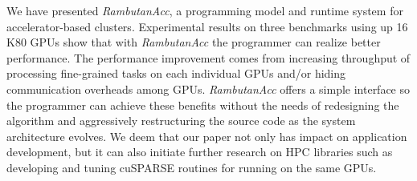 We have presented {\em RambutanAcc}, a programming model and runtime system for accelerator-based clusters.
Experimental results on three benchmarks using up 16 K80 GPUs show that with {\em RambutanAcc} the programmer can realize better performance.
The performance improvement comes from increasing throughput of processing fine-grained tasks on each individual GPUs and/or hiding communication overheads among GPUs.
{\em RambutanAcc} offers a simple interface so the programmer can achieve these benefits without the needs of redesigning the algorithm and aggressively restructuring the source code as the system architecture evolves.
We deem that our paper not only has impact on application development, but it can also initiate further research on HPC libraries such as developing and tuning cuSPARSE routines for running on the same GPUs. 
